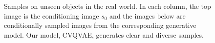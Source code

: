 \begin{figure}[t]
\begin{subfigure}[c]{0.3\textwidth}
{            %
        }
    \end{subfigure}

    \caption{Samples on unseen objects in the real world. In each column, the top image is the conditioning image $s_0$ and the images below are conditionally sampled images from the corresponding generative model. Our model, CVQVAE, generates clear and diverse samples.}
    \label{fig:real_samples}
    \vspace{-0.5cm}
\end{figure}